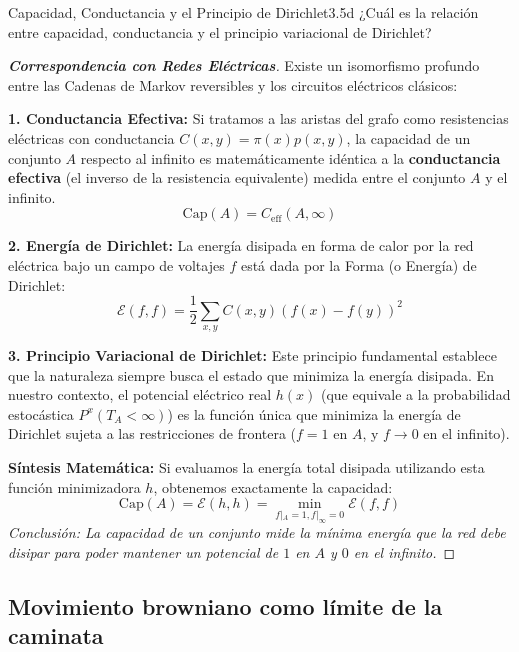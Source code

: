 \documentclass[10pt,a4paper]{article}
\begin{document}
\newpage

\begin{ejercicio}{Capacidad, Conductancia y el Principio de Dirichlet}{3.5d}
    ¿Cuál es la relación entre capacidad, conductancia y el principio variacional de Dirichlet?
\end{ejercicio}

\begin{proof}[\textbf{Correspondencia con Redes Eléctricas}]
    Existe un isomorfismo profundo entre las Cadenas de Markov reversibles y los circuitos eléctricos clásicos:
    
    \textbf{1. Conductancia Efectiva:} Si tratamos a las aristas del grafo como resistencias eléctricas con conductancia $C(x,y) = \pi(x)p(x,y)$, la capacidad de un conjunto $A$ respecto al infinito es matemáticamente idéntica a la \textbf{conductancia efectiva} (el inverso de la resistencia equivalente) medida entre el conjunto $A$ y el infinito.
    $$\text{Cap}(A) = C_{\text{eff}}(A, \infty)$$
    
    \textbf{2. Energía de Dirichlet:} La energía disipada en forma de calor por la red eléctrica bajo un campo de voltajes $f$ está dada por la Forma (o Energía) de Dirichlet:
    $$\mathcal{E}(f, f) = \frac{1}{2} \sum_{x,y} C(x,y) (f(x) - f(y))^2$$
    
    \textbf{3. Principio Variacional de Dirichlet:} Este principio fundamental establece que la naturaleza siempre busca el estado que minimiza la energía disipada. En nuestro contexto, el potencial eléctrico real $h(x)$ (que equivale a la probabilidad estocástica $P^x(T_A < \infty)$) es la función única que minimiza la energía de Dirichlet sujeta a las restricciones de frontera ($f=1$ en $A$, y $f \to 0$ en el infinito).
    
    \textbf{Síntesis Matemática:} Si evaluamos la energía total disipada utilizando esta función minimizadora $h$, obtenemos exactamente la capacidad:
    $$\text{Cap}(A) = \mathcal{E}(h, h) = \min_{f|_A=1, f|_\infty=0} \mathcal{E}(f, f)$$
    \textit{Conclusión: La capacidad de un conjunto mide la mínima energía que la red debe disipar para poder mantener un potencial de $1$ en $A$ y $0$ en el infinito.}
\end{proof}

\newpage
\subsection{Movimiento browniano como límite de la caminata}
\end{document}
